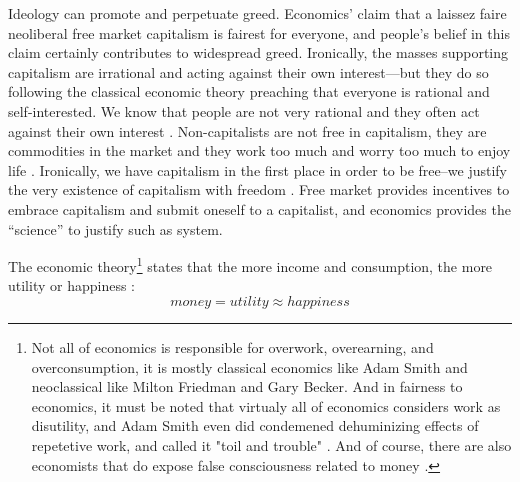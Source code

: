\documentclass[10pt, letterpaper]{article}
\begin{document}
\begin{spacing}{1.8}

Ideology can promote and perpetuate greed. Economics' claim that a laissez faire
neoliberal free market capitalism is fairest for everyone, and people's belief
in this claim certainly contributes to widespread greed. Ironically, the masses supporting capitalism are irrational and acting against
their own interest---but they do so following the classical economic theory preaching that everyone is rational and self-interested. 
We know that people are not very rational and they often act against their own
interest \citep{akerlof10,ariely09,shiller15}. Non-capitalists are not
free in capitalism, they are commodities in the market and they work too much and worry too much to enjoy life \citep{aokJap14}. Ironically, we
have capitalism in the first place in order to be free--we justify the very
existence of capitalism with freedom \citep{hayek14,friedman09,glaeser11B}. Free
market provides incentives to embrace capitalism and submit oneself to a capitalist, and economics provides the ``science'' to justify such as system.


The economic theory\footnote{Not all of economics is responsible for overwork, overearning, and
overconsumption, it is mostly classical economics like Adam Smith and neoclassical like
Milton Friedman and Gary Becker. And in fairness to  economics, it must
be noted that  virtualy all of economics considers work as disutility, and Adam
Smith  even did  condemened dehuminizing effects of repetetive work, and called
it "toil and trouble" \citep[][p. 54]{spencer20}.  
And of course, there are also economists that do
expose false consciousness related to money \citep[e.g,][]{kahneman06c}. %
} states that the more income and consumption, the
more utility or happiness \citep{autor10,becker08}: 
\begin{equation}
money 
  = utility \approx happiness
\end{equation}


\end{spacing}
\end{document}
